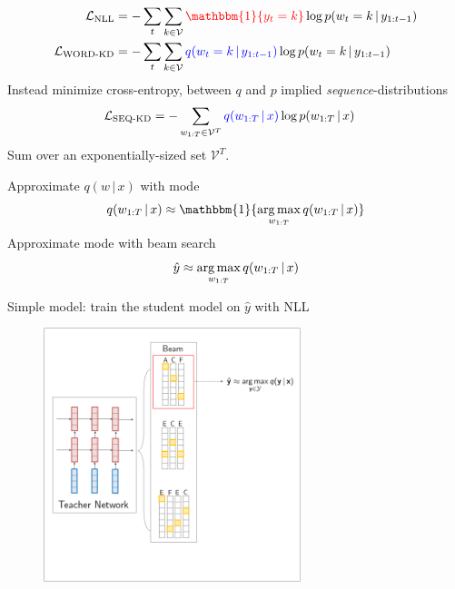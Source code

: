 \documentclass{beamer}
\newcommand{\air}{\vspace{0.25cm}}
\newcommand{\given}{\,|\,}
\def\argmax{\operatornamewithlimits{arg\,max}}
\def\argmax{\operatornamewithlimits{arg\,max}}
\begin{document}
\begin{frame}
\centerline{}
\air 
\begin{align*}
\mathcal{L}_{\text{NLL}} &=- \sum_t \sum_{k \in \mathcal{V}} {\color{red}{\mathbbm{1}\{y_t = k\}}} \log p(w_t = k \given  y_{1:t-1}) \\
\mathcal{L}_{\text{WORD-KD}} &=- \sum_t \sum_{k \in \mathcal{V}} {\color{blue}{q(w_t = k \given y_{1:t-1})}} \log p(w_t = k \given  y_{1:t-1})
\end{align*}
\pause
Instead minimize cross-entropy, between $q$ and $p$ implied \emph{sequence}-distributions 
\begin{align*}
\mathcal{L}_\text{SEQ-KD} &=  -\sum_{w_{1:T} \in \mathcal{V}^T}{\color{blue}{q(w_{1:T} \given x)}}  \log p(w_{1:T} \given x  )
\end{align*}
\air
Sum over an exponentially-sized set $\mathcal{V}^T$. 
\end{frame}

\begin{frame}
\centerline{}
\air 
\air
Approximate $q(w \given x )$ with mode
$$q(w_{1:T} \given x) \approx \mathbbm{1}\{\argmax_{w_{1:T}} q(w_{1:T} \given x )\}$$
\air
Approximate mode with  beam search 
$$ \hat{y} \approx  \argmax_{w_{1:T}} q(w_{1:T} \given x) $$


Simple model: train the student model on $\hat{y}$ with NLL
\end{frame}


\begin{frame}
\centerline{}
\air 
\air
\begin{figure}
\center
\includegraphics[width=7.5cm]{seq-kd-1}
\end{figure}
\end{frame}
\end{document}

